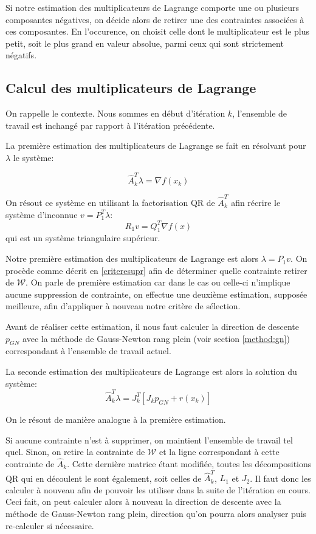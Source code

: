 \documentclass[a4paper,11pt]{article}
\newcommand{\ha}{\hat{A}}
\numberwithin{equation}{section}
\begin{document}
Si notre estimation des multiplicateurs de Lagrange comporte une ou plusieurs composantes négatives, on décide alors de retirer une des contraintes associées à ces composantes. En l'occurence, on choisit celle dont le multiplicateur est le plus petit, soit le plus grand en valeur absolue, parmi ceux qui sont strictement négatifs.

\subsection{Calcul des multiplicateurs de Lagrange}

On rappelle le contexte. Nous sommes en début d'itération $k$, l'ensemble de travail est inchangé par rapport à l'itération précédente.

La première estimation des multiplicateurs de Lagrange se fait en résolvant pour $\lambda$ le système:

\begin{equation}
\ha_{k}^T\lambda = \nabla f(x_{k})
\end{equation}

On résout ce système en utilisant la factorisation QR de $\ha_{k}^{T}$ afin récrire le système d'inconnue $v = P_{1}^{T}\lambda$:
$$ R_{1}v = Q_1^T\nabla f(x) $$
qui est un système triangulaire supérieur.

Notre première estimation des multiplicateurs de Lagrange est alors $\lambda=P_{1}v$. On procède comme décrit en \ref{criteresupr} afin de déterminer quelle contrainte retirer de $\mathcal{W}$. On parle de première estimation car dans le cas ou celle-ci n'implique aucune suppression de contrainte, on effectue une deuxième estimation, supposée meilleure, afin d'appliquer à nouveau notre critère de sélection.

Avant de réaliser cette estimation, il nous faut calculer la direction de descente $p_{GN}$ avec la méthode de Gauss-Newton rang plein (voir section \ref{method:gn}) correspondant à l'ensemble de travail actuel.

La seconde estimation des multiplicateurs de Lagrange est alors la solution du système:
\begin{equation}
\ha_{k}^T\lambda = J_{k}^T\left[J_{k}p_{GN} + r(x_{k})\right]
\end{equation}

On le résout de manière analogue à la première estimation. 


Si aucune contrainte n'est à supprimer, on maintient l'ensemble de travail tel quel. Sinon, on retire la contrainte de $\mathcal{W}$ et la ligne correspondant à cette contrainte de $\ha_{k}$. Cette dernière matrice étant modifiée, toutes les décompositions QR qui en découlent le sont également, soit celles de $\ha_{k}^{T}$, $L_{1}$ et $J_{2}$. Il faut donc les calculer à nouveau afin de pouvoir les utiliser dans la suite de l'itération en cours. Ceci fait, on peut calculer alors à nouveau la direction de descente avec la méthode de Gauss-Newton rang plein, direction qu'on pourra alors analyser puis re-calculer si nécessaire.
\end{document}
